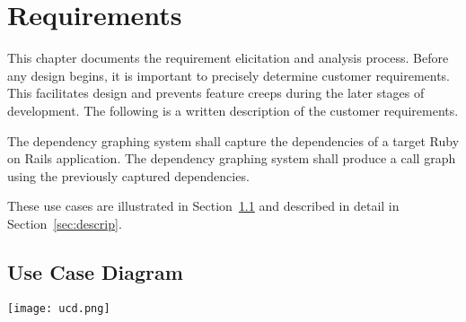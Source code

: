 \chapter{Requirements}
\label{chap:requirement}
This chapter documents the requirement elicitation and analysis process. Before any design begins, it is important to precisely determine customer requirements. This facilitates design and prevents feature creeps during the later stages of development. The following is a written description of the customer requirements.

The dependency graphing system shall capture the dependencies of a target Ruby on Rails application. The dependency graphing system shall produce a call graph using the previously captured dependencies.

These use cases are illustrated in Section~\ref{sec:ucd} and described in detail in Section~\ref{sec:descrip}.

\section{Use Case Diagram}
\label{sec:ucd}
\begin{center}
    \texttt{[image: ucd.png]}
    \label{fig:ucd}
\end{center}


